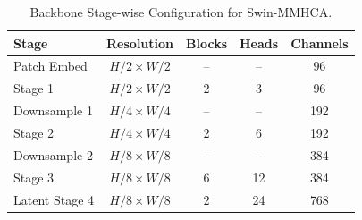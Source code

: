 \begin{table}[H]
\centering
\caption{Backbone Stage-wise Configuration for Swin-MMHCA.}
\label{tab:backbone_specs}
\begin{tabular}{lcccc}
\toprule
\textbf{Stage} & \textbf{Resolution} & \textbf{Blocks} & \textbf{Heads} & \textbf{Channels} \\
\midrule
Patch Embed    & $H/2 \times W/2$ & --  & --  & 96  \\
Stage 1        & $H/2 \times W/2$ & 2   & 3   & 96  \\
Downsample 1   & $H/4 \times W/4$ & --  & --  & 192 \\
Stage 2        & $H/4 \times W/4$ & 2   & 6   & 192 \\
Downsample 2   & $H/8 \times W/8$ & --  & --  & 384 \\
Stage 3        & $H/8 \times W/8$ & 6   & 12  & 384 \\
Latent Stage 4 & $H/8 \times W/8$ & 2   & 24  & 768 \\
\bottomrule
\end{tabular}
\end{table}